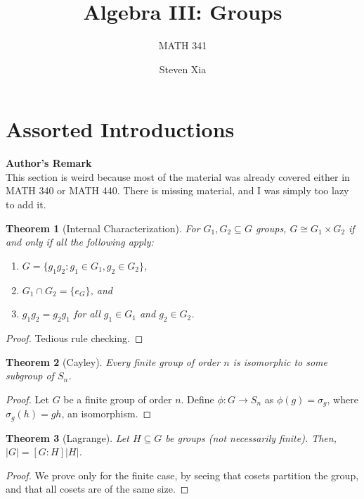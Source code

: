 \documentclass[
    parskip=half,
    toc=flat,
    toc=sectionentrydotfill,
]{scrartcl}  %
\title{Algebra III: Groups}
\subtitle{MATH 341}
\author{Steven Xia}
\theoremstyle{definition}
\theoremstyle{plain}
\newtheorem{theorem}{Theorem}[section]
\theoremstyle{remark}
\begin{document}
\maketitle
\tableofcontents

\section{Assorted Introductions}

\begin{center}
    \textbf{Author's Remark}\\
    This section is weird because most of the material was already covered
    either in MATH 340 or MATH 440.
    There is missing material, and I was simply too lazy to add it.
\end{center}

\begin{theorem}[Internal Characterization]
    For $G_1,G_2\subseteq G$ groups, $G\cong G_1\times G_2$ if and only if all
    the following apply:
    \begin{enumerate}[nosep]
        \item $G=\{g_1g_2:g_1\in G_1,g_2\in G_2\}$,
        \item $G_1\cap G_2=\{e_G\}$, and
        \item $g_1g_2=g_2g_1$ for all $g_1\in G_1$ and $g_2\in G_2$.
    \end{enumerate}
\end{theorem}

\begin{proof}
    Tedious rule checking.
\end{proof}

\begin{theorem}[Cayley]
    Every finite group of order $n$ is isomorphic to some subgroup of $S_n$.
\end{theorem}

\begin{proof}
    Let $G$ be a finite group of order $n$.
    Define $\phi:G\to S_n$ as $\phi(g)=\sigma_g$, where $\sigma_g(h)=gh$, an
    isomorphism.
\end{proof}

\begin{theorem}[Lagrange]
    Let $H\subseteq G$ be groups (not necessarily finite).
    Then, $|G|=[G:H]|H|$.
\end{theorem}

\begin{proof}
    We prove only for the finite case, by seeing that cosets partition the
    group, and that all cosets are of the same size.
\end{proof}
\end{document}
